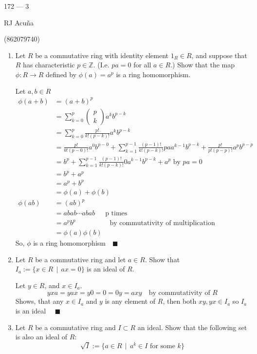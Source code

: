 \documentclass{article}
\newcommand\Z{\mathbb{Z}}
\begin{document}
\begin{center}
  172 --- 3

  RJ Acuña

  (862079740)
\end{center}\vspace{1.618em}


\begin{enumerate}
\item Let $R$ be a commutative ring with identity element $1_R \in R$, and suppose that $R$ has characteristic $p \in \Z$. (I.e. $pa = 0$ for all $a \in R$.) Show that the map $\phi:R \to R$ defined by $\phi(a) = a^p$ is a ring homomorphism.


  Let $a,b\in R$
\begin{align*}
  \phi(a+b)
  &= (a+b)^p\\
  &= \sum_{k=0}^p \begin{pmatrix}p \\
    k\end{pmatrix} a^kb^{p-k}\\
  &= \sum_{k=0}^p
    \frac{p!}{k!(p-k)!}a^kb^{p-k}\\
  &= \frac{p!}{0!(p-0)!}a^0b^{p-0} + \sum_{k=1}^{p-1}
  \frac{(p-1)!}{k!(p-k)!} pa a^{k-1}b^{p-k} +
    \frac{p!}{p!(p-p)!}a^pb^{p-p}\\
  &= b^{p} + \sum_{k=1}^{p-1}
    \frac{(p-1)!}{k!(p-k)!} 0 a^{k-1}b^{p-k} + a^p \text{ by } pa=0\\
  &= b^p+a^p\\
  &= a^p + b^p\\
  &=\phi(a)+\phi(b)\\
  \phi(ab)
  &= (ab)^p\\
  &= abab\cdots abab\quad\, \text{ p times} \\
  &= a^pb^p\hspace{5em} \text{by commutativity of multiplication}\\
  &= \phi(a)\phi(b)
\end{align*}
So, $\phi$ is a ring homomorphism$\quad \blacksquare$
\item Let $R$ be a commutative ring and let $a \in R$. Show that $I_a := \{x \in R \,\mid\, ax=0\}$ is an ideal of $R$.


  Let $y\in R$, and $x \in I_a$.
  \[ yxa =yax= y0 = 0 = 0y = axy\quad \text{by commutativity of } R \]
  Shows, that any  $x \in I_a$ and $y$ is any element of $R$, then both $xy,
  yx\in I_a$ so $I_a$ is an ideal $\quad \blacksquare$
\item Let $R$ be a commutative ring and $I \subset R$ an ideal. Show that the following set is also an ideal of $R$:
\[
\sqrt{I} := \{a \in R \,\mid\, a^k \in I \textrm{ for some } k\}
\]


\end{enumerate}
\end{document}
